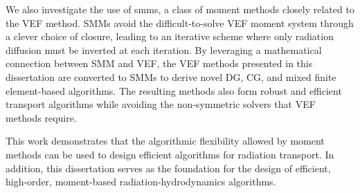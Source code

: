 \documentclass[../doc.tex]{subfiles}
\begin{document}
We also investigate the use of \glspl{smm}, a class of moment methods closely related to the VEF method. SMMs avoid the difficult-to-solve VEF moment system through a clever choice of closure, leading to an iterative scheme where only radiation diffusion must be inverted at each iteration. 
By leveraging a mathematical connection between SMM and VEF, the VEF methods presented in this dissertation are converted to SMMs to derive novel DG, CG, and mixed finite element-based algorithms. The resulting methods also form robust and efficient transport algorithms while avoiding the non-symmetric solvers that VEF methods require. 

This work demonstrates that the algorithmic flexibility allowed by moment methods can be used to design efficient algorithms for radiation transport. In addition, this dissertation serves as the foundation for the design of efficient, high-order, moment-based radiation-hydrodynamics algorithms. 
\end{document}
